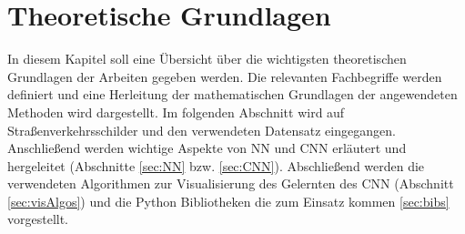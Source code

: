 \newpage
\section{Theoretische Grundlagen} \label{infos}
In diesem Kapitel soll eine Übersicht über die wichtigsten theoretischen Grundlagen der Arbeiten gegeben werden. Die relevanten Fachbegriffe werden definiert und eine Herleitung der mathematischen Grundlagen der angewendeten Methoden wird dargestellt. Im folgenden Abschnitt wird auf Straßenverkehrsschilder und den verwendeten Datensatz eingegangen.  Anschließend werden wichtige Aspekte von \ac{NN} und \ac{CNN} erläutert und hergeleitet (Abschnitte \ref{sec:NN} bzw. \ref{sec:CNN}). Abschließend werden die verwendeten Algorithmen zur Visualisierung des Gelernten des \ac{CNN} (Abschnitt \ref{sec:visAlgos}) und die Python Bibliotheken die zum Einsatz kommen \ref{sec:bibs} vorgestellt. 
 



